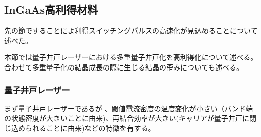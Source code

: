 \clearpage
\subsection{InGaAs高利得材料}
先の節ですることによ利得スイッチングパルスの高速化が見込めることについて述べた。

本節では量子井戸レーザーにおける多重量子井戸化を高利得化について述べる。合わせて多重量子化の結晶成長の際に生じる結晶の歪みについても述べる。
\subsubsection{量子井戸レーザー}
まず量子井戸レーザーであるが
、閾値電流密度の温度変化が小さい（バンド端の状態密度が大きいことに由来)、再結合効率が大きい(キャリアが量子井戸に閉じ込められることに由来)などの特徴を有する。


